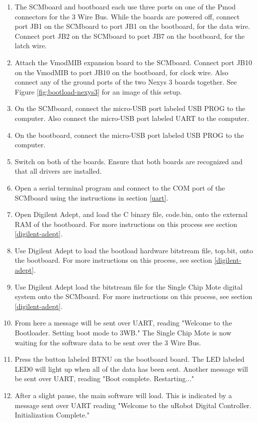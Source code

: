 \begin{enumerate}
	\item The SCMboard and bootboard each use three ports on one of the Pmod connectors for the 3 Wire Bus. While the boards are powered off, connect port JB1 on the SCMboard to port JB1 on the bootboard, for the data wire. Connect port JB2 on the SCMboard to port JB7 on the bootboard, for the latch wire.
	\item Attach the VmodMIB expansion board to the SCMboard. Connect port JB10 on the VmodMIB to port JB10 on the bootboard, for clock wire. Also connect any of the ground ports of the two Nexys 3 boards together. See Figure \ref{fig:bootload-nexys3} for an image of this setup.
	\item On the SCMboard, connect the micro-USB port labeled USB PROG to the computer. Also connect the micro-USB port labeled UART to the computer.
	\item On the bootboard, connect the micro-USB port labeled USB PROG to the computer.
	\item Switch on both of the boards. Ensure that both boards are recognized and that all drivers are installed.
	\item Open a serial terminal program and connect to the COM port of the SCMboard using the instructions in section \ref{uart}.
	\item Open Digilent Adept, and load the C binary file, code.bin, onto the external RAM of the bootboard. For more instructions on this process see section \ref{digilent-adept}.
	\item Use Digilent Adept to load the bootload hardware bitstream file, top.bit, onto the bootboard. For more instructions on this process, see section \ref{digilent-adept}.
	\item Use Digilent Adept load the bitstream file for the Single Chip Mote digital system onto the SCMboard. For more instructions on this process, see section \ref{digilent-adept}.
	\item From here a message will be sent over UART, reading "Welcome to the Bootloader. Setting boot mode to 3WB." The Single Chip Mote is now waiting for the software data to be sent over the 3 Wire Bus.
	\item Press the button labeled BTNU on the bootboard board. The LED labeled LED0 will light up when all of the data has been sent. Another message will be sent over UART, reading "Boot complete. Restarting..."
	\item After a slight pause, the main software will load. This is indicated by a message sent over UART reading "Welcome to the uRobot Digital Controller. Initialization Complete."
\end{enumerate}

